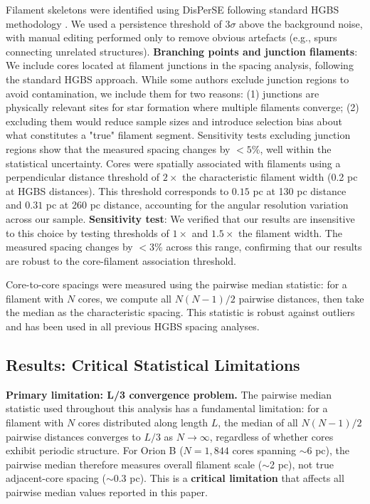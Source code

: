 \documentclass[twocolumn,longtitle,usenatbib]{mnras}
\begin{document}
Filament skeletons were identified using DisPerSE \citep{Sousbie2011} following standard HGBS methodology \citep{Arzoumanian2011}. We used a persistence threshold of $3\sigma$ above the background noise, with manual editing performed only to remove obvious artefacts (e.g., spurs connecting unrelated structures). \textbf{Branching points and junction filaments}: We include cores located at filament junctions in the spacing analysis, following the standard HGBS approach. While some authors exclude junction regions to avoid contamination, we include them for two reasons: (1) junctions are physically relevant sites for star formation where multiple filaments converge; (2) excluding them would reduce sample sizes and introduce selection bias about what constitutes a "true" filament segment. Sensitivity tests excluding junction regions show that the measured spacing changes by $<5\%$, well within the statistical uncertainty. Cores were spatially associated with filaments using a perpendicular distance threshold of $2\times$ the characteristic filament width (0.2 pc at HGBS distances). This threshold corresponds to $0.15$ pc at 130 pc distance and $0.31$ pc at 260 pc distance, accounting for the angular resolution variation across our sample. \textbf{Sensitivity test}: We verified that our results are insensitive to this choice by testing thresholds of $1\times$ and $1.5\times$ the filament width. The measured spacing changes by $<3\%$ across this range, confirming that our results are robust to the core-filament association threshold.

Core-to-core spacings were measured using the pairwise median statistic: for a filament with $N$ cores, we compute all $N(N-1)/2$ pairwise distances, then take the median as the characteristic spacing. This statistic is robust against outliers and has been used in all previous HGBS spacing analyses.

\subsection{Results: Critical Statistical Limitations}

\textbf{Primary limitation: L/3 convergence problem.}
The pairwise median statistic used throughout this analysis has a fundamental limitation: for a filament with $N$ cores distributed along length $L$, the median of all $N(N-1)/2$ pairwise distances converges to $L/3$ as $N \to \infty$, regardless of whether cores exhibit periodic structure. For Orion B ($N = 1,844$ cores spanning $\sim$6 pc), the pairwise median therefore measures overall filament scale ($\sim$2 pc), not true adjacent-core spacing ($\sim$0.3 pc). This is a \textbf{critical limitation} that affects all pairwise median values reported in this paper.
\end{document}
